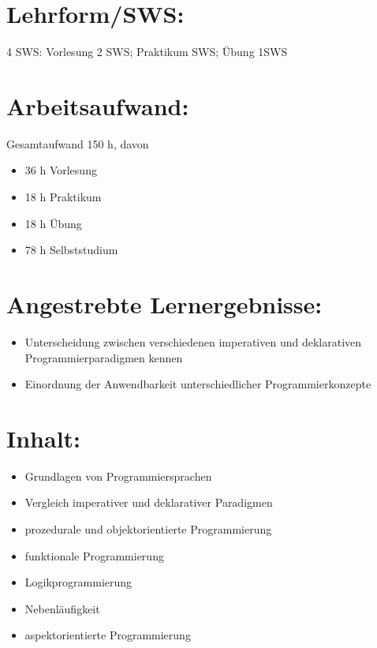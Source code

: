 \section*{Lehrform/SWS:}\label{lehrformsws-17}

4 SWS: Vorlesung 2 SWS; Praktikum SWS; Übung 1SWS

\section*{Arbeitsaufwand:}\label{arbeitsaufwand-16}

Gesamtaufwand 150 h, davon

\begin{itemize}
\item
  36 h Vorlesung
\item
  18 h Praktikum
\item
  18 h Übung
\item
  78 h Selbststudium
\end{itemize}

\section*{Angestrebte
Lernergebnisse:}\label{angestrebte-lernergebnisse-17}

\begin{itemize}
\item
  Unterscheidung zwischen verschiedenen imperativen und deklarativen
  Programmierparadigmen kennen
\item
  Einordnung der Anwendbarkeit unterschiedlicher Programmierkonzepte
\end{itemize}

\section*{Inhalt:}\label{inhalt-17}

\begin{itemize}
\item
  Grundlagen von Programmiersprachen
\item
  Vergleich imperativer und deklarativer Paradigmen
\item
  prozedurale und objektorientierte Programmierung
\item
  funktionale Programmierung
\item
  Logikprogrammierung
\item
  Nebenläufigkeit
\item
  aspektorientierte Programmierung
\end{itemize}

